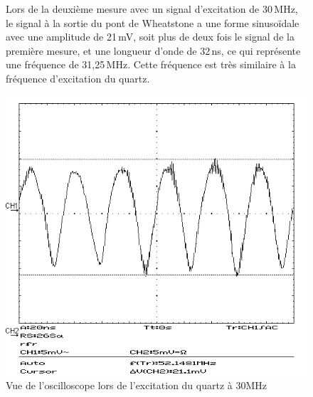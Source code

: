 \begin{figure}[H]
    \centering
    \begin{minipage}{0.48\textwidth}
        \small
        Lors de la deuxième mesure avec un signal d'excitation de 30\,MHz, le signal à la sortie du pont de Wheatstone a une forme sinusoïdale avec une amplitude de 21\,mV, soit plus de deux fois le signal de la première mesure, et une longueur d'onde de 32\,ns, ce qui représente une fréquence de 31,25\,MHz.
        Cette fréquence est très similaire à la fréquence d'excitation du quartz.
    \end{minipage}\hfill
    \begin{minipage}{0.48\textwidth}
        \centering
        \includegraphics[width=\textwidth]{assets/figures/SCR00007.png}
        \caption{Vue de l'oscilloscope lors de l'excitation du quartz à 30MHz}
        \label{fig:30mhzbruit}
    \end{minipage}
\end{figure}

